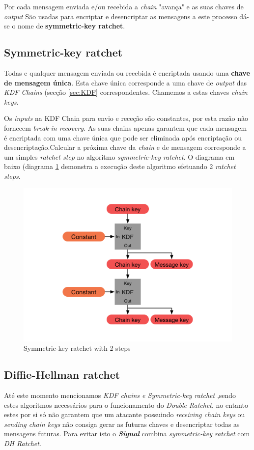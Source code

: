 Por cada mensagem enviada e/ou recebida a \emph{chain} "avança" e as suas chaves de \emph{output} São usadas para encriptar e desencriptar as mensagens a este processo dá-se o nome de \textbf{symmetric-key ratchet}.

\subsection{Symmetric-key ratchet}\label{sec:symkey}
Todas e qualquer mensagem enviada ou recebida é encriptada usando uma \textbf{chave de mensagem única}. Esta chave única corresponde a uma chave de \textit{output} das \textit{KDF Chains} (secção \ref{sec:KDF} correspondentes. Chamemos a estas chaves \textit{chain keys}.

Os \textit{inputs} na KDF Chain para envio e receção são constantes, por esta razão não fornecem \textit{break-in recovery}. As suas chains apenas garantem que cada mensagem é encriptada com uma chave única que pode ser eliminada após encriptação ou desencriptação.Calcular a próxima chave da \textit{chain} e de mensagem corresponde a um simples \textit{ratchet step} no algoritmo \textit{symmetric-key ratchet}.
O diagrama em baixo (diagrama \ref{diagram:skRatchet} demonstra a execução deste algoritmo efetuando 2 \textit{ratchet steps}.

\begin{figure}[H]
\begin{center}
\includegraphics[width=12cm]{img/skRatchet.png}
\caption{Symmetric-key ratchet with 2 steps}
\label{diagram:skRatchet}
\centering
\end{center}
\end{figure}

\subsection{Diffie-Hellman ratchet}\label{sec:dhratchet}
Até este momento mencionamos \textit{KDF chains e Symmetric-key ratchet} ,sendo estes algoritmos necessários para o funcionamento do \textit{Double Ratchet}, no entanto estes por si só não garantem que um atacante possuindo \textit{receiving chain keys} ou \textit{sending chain keys} não consiga gerar as futuras chaves e desencriptar todas as mensagens futuras. Para evitar isto o \textbf{\textit{Signal}} combina \textit{symmetric-key ratchet} com \textit{DH Ratchet}.


